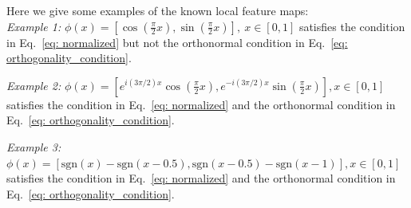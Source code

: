 \documentclass[nonatbib]{article}
\begin{document}
Here we give some examples of the known local feature maps:\\
\emph{Example 1:} $\phi(x) = [\cos(\frac{\pi}{2}x), \sin(\frac{\pi}{2}x)],\  x\in[0,1]$
satisfies the condition in Eq.~\eqref{eq: normalized} but not the orthonormal condition in Eq.~\eqref{eq: orthogonality_condition}.

\emph{Example 2:}  $\phi(x) = [e^{i(3\pi/2)x}\cos(\frac{\pi}{2}x), e^{-i(3\pi/2)x}\sin(\frac{\pi}{2}x)], x\in[0,1]$
satisfies the condition in Eq.~\eqref{eq: normalized} and the orthonormal condition in Eq.~\eqref{eq: orthogonality_condition}.

\emph{Example 3:}  $\phi(x) = [\text{sgn}(x)-\text{sgn}(x-0.5), \text{sgn}(x-0.5)-\text{sgn}(x-1)], x\in[0,1]$
satisfies the condition in Eq.~\eqref{eq: normalized} and the orthonormal condition in Eq.~\eqref{eq: orthogonality_condition}.

    
    
\end{document}
